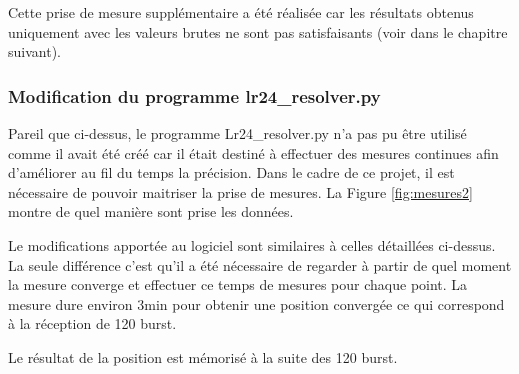 Cette prise de mesure supplémentaire a été réalisée car les résultats obtenus uniquement avec les valeurs brutes ne sont pas satisfaisants (voir dans le chapitre suivant). 

\subsubsection{Modification du programme lr24\_resolver.py}
Pareil que ci-dessus, le programme Lr24\_resolver.py n'a pas pu être utilisé comme il avait été créé car il était destiné à effectuer des mesures continues afin d'améliorer au fil du temps la précision. Dans le cadre de ce projet, il est nécessaire de pouvoir maitriser la prise de mesures. La Figure \ref{fig:mesures2} montre de quel manière sont prise les données.

Le modifications apportée au logiciel sont similaires à celles détaillées ci-dessus. La seule différence c'est qu'il a été nécessaire de regarder à partir de quel moment la mesure converge et effectuer ce temps de mesures pour chaque point. La mesure dure environ 3min pour obtenir une position convergée ce qui correspond à la réception de 120 burst. 

Le résultat de la position est mémorisé à la suite des 120 burst. 

